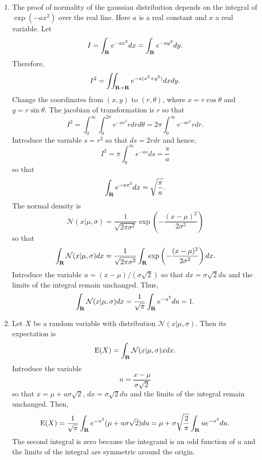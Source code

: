 \begin{enumerate}
\item The proof of normality of the gaussian distribution depends on the integral of $\exp(-ax^2)$
over the real line. Here $a$ is a real constant and $x$ a real variable. Let
\[
I = \int_{\mathbf{R}} e^{-ax^2}dx = \int_{\mathbf{R}} e^{-ay^2}dy.
\]
Therefore,
\[
I^2 = \iint_{\mathbf{R}\times\mathbf{R}}e^{-a(x^2+y^2)}dxdy.
\]
Change the coordinates from $(x, y)$ to $(r, \theta)$, where $x = r\cos\theta$ and $y = r\sin\theta$.
The jacobian of transformation is $r$ so that
\[
I^2 = \int_0^\infty\int_0^{2\pi}e^{-ar^2}rdrd\theta = 2\pi\int_0^\infty e^{-ar^2}rdr.
\]
Introduce the variable $s = r^2$ so that $ds = 2rdr$ and hence,
\[
I^2 = \pi\int_0^\infty e^{-as}ds = \frac{\pi}{a}
\]
so that
\begin{equation}\label{c1pe5}
\int_{\mathbf{R}} e^{-ax^2}dx = \sqrt{\frac{\pi}{a}}.
\end{equation}
The normal density is
\[
\mathcal{N}(x|\mu,\sigma) = \frac{1}{\sqrt{2\pi\sigma^2}}\exp\left(-\frac{(x - \mu)^2}{2\sigma^2}\right)
\]
so that
\[
\int_{\mathbf{R}}\mathcal{N}(x|\mu,\sigma)dx = \frac{1}{\sqrt{2\pi\sigma^2}}\int_{\mathbf{R}}\exp\left(-\frac{(x - \mu)^2}{2\sigma^2}\right)dx.
\]
Introduce the variable $u = (x - \mu)/(\sigma\sqrt{2})$ so that $dx = \sigma\sqrt{2}du$ and the limits of the integral
remain unchanged. Thus,
\[
\int_{\mathbf{R}}\mathcal{N}(x|\mu,\sigma)dx = \frac{1}{\sqrt{\pi}}\int_{\mathbf{R}} e^{-u^2}du = 1.
\]

\item Let $X$ be a random variable with distribution $\mathcal{N}(x|\mu,\sigma)$. Then its expectation
is
\[
\operatorname{E}(X) = \int_{\mathbf{R}}\mathcal{N}(x|\mu,\sigma)xdx.
\]
Introduce the variable
\begin{equation}\label{c1pe6}
u = \frac{x - \mu}{\sigma\sqrt{2}}
\end{equation}
so that $x = \mu + u\sigma\sqrt{2}$, $dx = \sigma\sqrt{2}du$ and the limits of
the integral remain unchanged. Then,
\[
\operatorname{E}(X) = \frac{1}{\sqrt{\pi}}\int_{\mathbf{R}} e^{-u^2}(\mu + u\sigma\sqrt{2})du = \mu + \sigma\sqrt{\frac{2}{\pi}}\int_{\mathbf{R}} ue^{-u^2}du.
\]
The second integral is zero because the integrand is an odd function of $u$ and the limits of the
integral are symmetric around the origin.


\end{enumerate}
